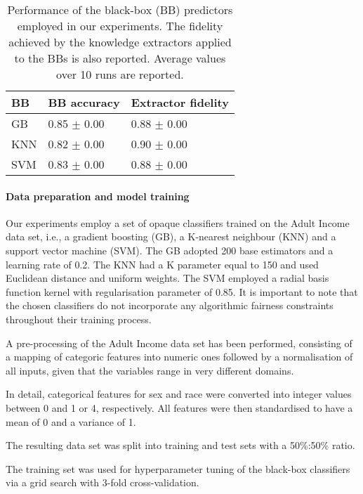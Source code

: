 \documentclass[letterpaper]{article} %
\begin{document}
\begin{table}[t!]
	\begin{center}{\caption{Performance of the black-box (BB) predictors employed in our experiments. The fidelity achieved by the knowledge extractors applied to the BBs is also reported. Average values over 10 runs are reported.}\label{tab:bb}}
		\begin{tabular}{lll}
			\toprule
			BB & BB accuracy & Extractor fidelity  \\
			\midrule					
			GB & 0.85 $\pm$ 0.00 & 0.88 $\pm$ 0.00 \\
			\midrule
			KNN & 0.82 $\pm$ 0.00 & 0.90 $\pm$ 0.00 \\
			\midrule
			SVM & 0.83 $\pm$ 0.00 & 0.88 $\pm$ 0.00 \\
			\bottomrule
		\end{tabular}
	\end{center}
\end{table}

\paragraph{Data preparation and model training}

Our experiments employ a set of opaque classifiers trained on the Adult Income data set, i.e., a gradient boosting (GB), a K-nearest neighbour (KNN) and a support vector machine (SVM). 
%
The GB adopted 200 base estimators and a learning rate of 0.2.
%
The KNN had a K parameter equal to 150 and used Euclidean distance and uniform weights.
%
The SVM employed a radial basis function kernel with regularisation parameter of 0.85.
%
It is important to note that the chosen classifiers do not incorporate any algorithmic fairness constraints throughout their training process.

A pre-processing of the Adult Income data set has been performed, consisting of a mapping of categoric features into numeric ones followed by a normalisation of all inputs, given that the variables range in very different domains.

In detail, categorical features for sex and race were converted into integer values between 0 and 1 or 4, respectively. All features were then standardised to have a mean of 0 and a variance of 1.

The resulting data set was split into training and test sets with a 50\%:50\% ratio.

The training set was used for hyperparameter tuning of the black-box classifiers via a grid search with 3-fold cross-validation.
\end{document}

